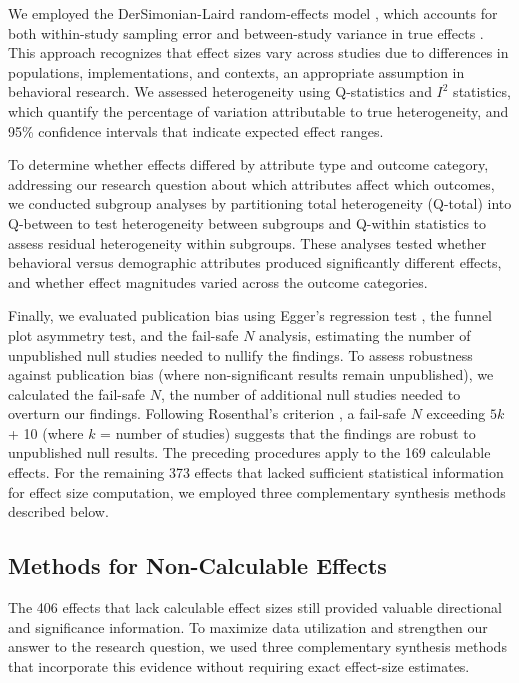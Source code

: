 \documentclass[manuscript,screen,review,anonymous]{acmart}
\DeclareRobustCommand{\change}[1]{%
    \textcolor{changeblue}{#1}%
  }
\DeclareRobustCommand{\change}[1]{#1}
\begin{document}
We employed the DerSimonian-Laird random-effects model \citep{dersimonian1986meta}, which accounts for both within-study sampling error and between-study variance in true effects \cite{klein_effects_2025}. This approach recognizes that effect sizes vary across studies due to differences in populations, implementations, and contexts, an appropriate assumption in behavioral research. %
We assessed heterogeneity using Q-statistics and $I^2$ statistics, which quantify the percentage of variation attributable to true heterogeneity, and 95\% confidence intervals that indicate expected effect ranges. %

To determine whether effects differed by attribute type and outcome category, addressing our research question about which attributes affect which outcomes, we conducted subgroup analyses by partitioning total heterogeneity (Q-total) into Q-between to test heterogeneity between subgroups and Q-within statistics to assess residual heterogeneity within subgroups. These analyses tested whether behavioral versus demographic attributes produced significantly different effects, and whether effect magnitudes varied across the outcome categories. 

Finally, we evaluated publication bias using Egger's regression test \citep{egger1997bias}, the funnel plot asymmetry test, and the fail-safe $N$ analysis, estimating the number of unpublished null studies needed to nullify the findings. To assess robustness against publication bias (where non-significant results remain unpublished), we calculated the fail-safe $N$, the number of additional null studies needed to overturn our findings. Following Rosenthal's criterion \citep{rosenthal1979file}, a fail-safe $N$ exceeding $5k$ + 10 (where $k$ = number of studies) suggests that the findings are robust to unpublished null results. \change{The preceding procedures apply to the 169 calculable effects. For the remaining 373 effects that lacked sufficient statistical information for effect size computation, we employed three complementary synthesis methods described below.}

\subsection{Methods for Non-Calculable Effects}

The 406 effects that lack calculable effect sizes still provided valuable directional and significance information. To maximize data utilization and strengthen our answer to the research question, we used three complementary synthesis methods that incorporate this evidence without requiring exact effect-size estimates.
\end{document}
